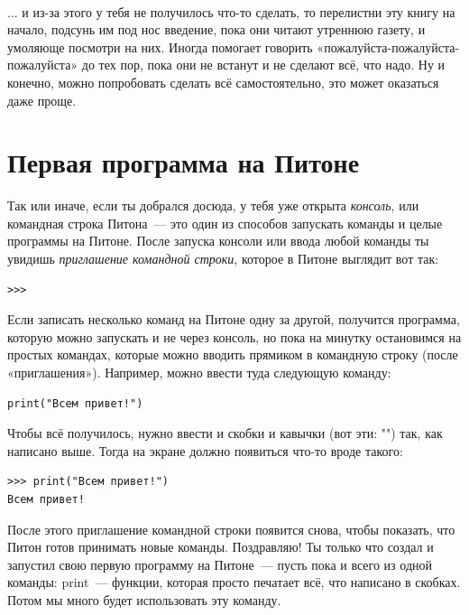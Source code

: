\begin{samepage}
\nopagebreak
\paragraph*{}
... и из-за этого у тебя не получилось что-то сделать, то перелистни эту книгу на начало, подсунь им под нос введение, пока они читают утреннюю газету, и умоляюще посмотри на них. Иногда помогает говорить «пожалуйста-пожалуйста-пожалуйста» до тех пор, пока они не встанут и не сделают всё, что надо. Ну и конечно, можно попробовать сделать всё самостоятельно, это может оказаться даже проще.
\end{samepage}

\section{Первая программа на Питоне}

Так или иначе, если ты добрался досюда, у тебя уже открыта \emph{консоль}, или командная строка Питона — это один из способов запускать команды и целые программы на Питоне. После запуска консоли или ввода любой команды ты увидишь \emph{приглашение командной строки}, которое в Питоне выглядит вот так:

\begin{verbatim}
>>>
\end{verbatim}

Если записать несколько команд на Питоне одну за другой, получится программа, которую можно запускать и не через консоль, но пока на минутку остановимся на простых командах, которые можно вводить прямиком в командную строку (после «приглашения»). Например, можно ввести туда следующую команду:

\begin{verbatim}
print("Всем привет!")
\end{verbatim}

Чтобы всё получилось, нужно ввести и скобки и кавычки (вот эти: "") так, как написано выше. Тогда на экране должно появиться что-то вроде такого:

\begin{verbatim}
>>> print("Всем привет!")
Всем привет!
\end{verbatim}

После этого приглашение командной строки появится снова, чтобы показать, что Питон готов принимать новые команды. Поздравляю! Ты только что создал и запустил свою первую программу на Питоне — пусть пока и всего из одной команды: print — функции, которая просто печатает всё, что написано в скобках. Потом мы много будет использовать эту команду.

